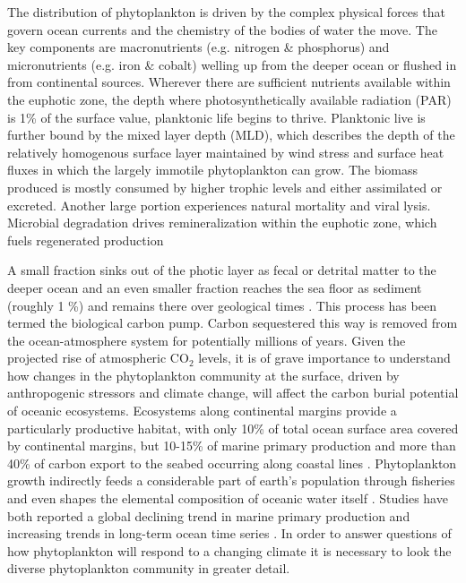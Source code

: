The distribution of phytoplankton is driven by the complex physical forces that govern ocean currents and the chemistry of the bodies of water the move. The key components are macronutrients (e.g. nitrogen \& phosphorus) and micronutrients (e.g. iron \& cobalt) welling up from the deeper ocean or flushed in from continental sources. Wherever there are sufficient nutrients available within the euphotic zone, the depth where photosynthetically available radiation (PAR) is 1\% of the surface value, planktonic life begins to thrive. Planktonic live is further bound by the mixed layer depth (MLD), which describes the depth of the relatively homogenous surface layer maintained by wind stress and surface heat fluxes in which the largely immotile phytoplankton can grow. The biomass produced is mostly consumed by higher trophic levels and either assimilated or excreted. Another large portion experiences natural mortality and viral lysis. Microbial degradation drives remineralization within the euphotic zone, which fuels regenerated production \citep{Eppley1979}

A small fraction sinks out of the photic layer as fecal or detrital matter to the deeper ocean and an even smaller fraction reaches the sea floor as sediment (roughly 1 \%) and remains there over geological times \citep{Honjo2008}. This process has been termed the biological carbon pump. Carbon sequestered this way is removed from the ocean-atmosphere system for potentially millions of years. Given the projected rise of atmospheric CO$_2$ levels, it is of grave importance to understand how changes in the phytoplankton community at the surface, driven by anthropogenic stressors and climate change, will affect the carbon burial potential of oceanic ecosystems. Ecosystems along continental margins provide a particularly productive habitat, with only 10\% of total ocean surface area covered by continental margins, but 10-15\% of marine primary production and more than 40\% of carbon export to the seabed occurring along coastal lines \citep{Yool2001,Muller-Karger2005}. Phytoplankton growth indirectly feeds a considerable part of earth’s population through fisheries \citep{Stock2017} and even shapes the elemental composition of oceanic water itself \citep{Redfield1958}. Studies have both reported a global declining trend in marine primary production \citep{Boyce2012} and increasing trends in long-term ocean time series \citep{Chavez2011a}. In order to answer questions of how phytoplankton will respond to a changing climate it is necessary to look the diverse phytoplankton community in greater detail. 

